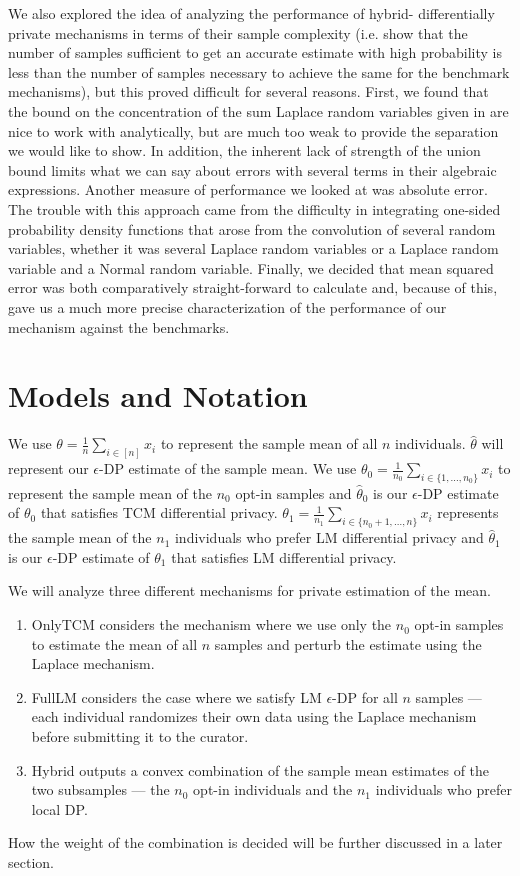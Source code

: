 \documentclass[sigconf]{acmart}
\theoremstyle{plain}
\begin{document}
We also explored the idea of analyzing the performance of hybrid- differentially private mechanisms in terms of their sample complexity (i.e. show that the number of samples sufficient to get an accurate estimate with high probability is less than the number of samples necessary to achieve the same for the benchmark mechanisms), but this proved difficult for several reasons. First, we found that the bound on the concentration of the sum Laplace random variables given in \cite{Chan:2011:PCR:2043621.2043626} are nice to work with analytically, but are much too weak to provide the separation we would like to show. In addition, the inherent lack of strength of the union bound limits what we can say about errors with several terms in their algebraic expressions. Another measure of performance we looked at was absolute error. The trouble with this approach came from the difficulty in integrating one-sided probability density functions that arose from the convolution of several random variables, whether it was several Laplace random variables or a Laplace random variable and a Normal random variable. Finally, we decided that mean squared error was both comparatively straight-forward to calculate and, because of this, gave us a much more precise characterization of the performance of our mechanism against the benchmarks. 

\section{Models and Notation}
We use $\theta = \frac{1}{n}\sum_{i \in [n]}x_i$ to represent the sample mean of all $n$ individuals. $\hat{\theta}$ will represent our $\epsilon$-DP estimate of the sample mean. We use $\theta_0 = \frac{1}{n_0}\sum_{i \in \{1, \dots, n_0\}} x_i$ to represent the sample mean of the $n_0$ opt-in samples and $\hat{\theta}_0$ is our $\epsilon$-DP estimate of $\theta_0$ that satisfies TCM differential privacy. $\theta_1 = \frac{1}{n_1}\sum_{i \in \{n_0+1, \dots, n\}} x_i$ represents the sample mean of the $n_1$ individuals who prefer LM differential privacy and $\hat{\theta}_1$ is our $\epsilon$-DP estimate of $\theta_1$ that satisfies LM differential privacy. 

We will analyze three different mechanisms for private estimation of the mean. 
\begin{enumerate}
\item OnlyTCM considers the mechanism where we use only the $n_0$ opt-in samples to estimate the mean of all $n$ samples and perturb the estimate using the Laplace mechanism. 
\item FullLM considers the case where we satisfy LM $\epsilon$-DP for all $n$ samples — each individual randomizes their own data using the Laplace mechanism before submitting it to the curator.  
\item Hybrid outputs a convex combination of the sample mean estimates of the two subsamples — the $n_0$ opt-in individuals and the $n_1$ individuals who prefer local DP.
\end{enumerate}
How the weight of the combination is decided will be further discussed in a later section. 
\end{document}
